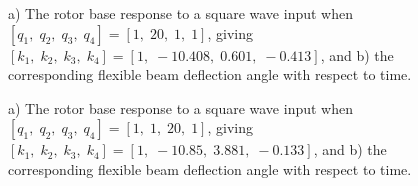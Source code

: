 \documentclass[12pt]{report}
\begin{document}
\begin{enumerate}
{\begin{figure}[htb!]
                  \caption{a) The rotor base response to a square wave input when $[q_1,\; q_2,\; q_3,\; q_4] = [1,\; 20,\; 1,\; 1]$, giving $[k_1,\; k_2,\; k_3,\; k_4] = [1,\; -10.408,\; 0.601,\; -0.413]$, and b) the corresponding flexible beam deflection angle with respect to time.}
              \end{figure}
              \begin{figure}[htb!]
                  \caption{a) The rotor base response to a square wave input when $[q_1,\; q_2,\; q_3,\; q_4] = [1,\; 1,\; 20,\; 1]$, giving $[k_1,\; k_2,\; k_3,\; k_4] = [1,\; -10.85,\; 3.881,\; -0.133]$, and b) the corresponding flexible beam deflection angle with respect to time.}
              \end{figure}
}
\end{enumerate}
\end{document}
